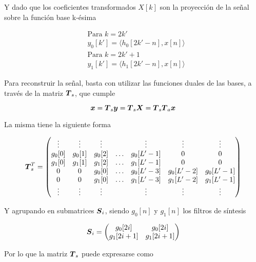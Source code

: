 Y dado que los coeficientes transformados $X[k]$ son la proyección de la señal sobre la función base k-ésima
	
	\begin{align}
		&\text{Para $k=2k'$}	\nonumber \\
		&y_0[k']=\langle h_0[2k'-n], x[n]\rangle		
	\end{align}
	\begin{align}
		&\text{Para $k=2k'+1$}	\nonumber \\
		&y_1[k']=\langle h_1[2k'-n], x[n]\rangle
	\end{align}

Para reconstruir la señal, basta con utilizar las funciones duales de las bases, a través de la matriz $\boldsymbol{T}_s$, que cumple

	\begin{equation}
		\boldsymbol{x}=\boldsymbol{T}_s\boldsymbol{y}=\boldsymbol{T}_s\boldsymbol{X}=\boldsymbol{T}_s\boldsymbol{T}_a\boldsymbol{x}
	\end{equation}

La misma tiene la siguiente forma

	\begin{equation}
		\vect{T}^T_s
		=
		\begin{pmatrix*}[c]
			\vdots & \vdots & \vdots & & \vdots & \vdots & \vdots\\
			g_0[0] & g_0[1] & g_0[2] & \hdots & g_0[L'-1] & 0 & 0 \\
			g_1[0] & g_1[1] & g_1[2] & \hdots & g_1[L'-1] & 0 & 0 \\
			0 & 0 & g_0[0] & \hdots & g_0[L'-3] & g_0[L'-2] & g_0[L'-1] \\
			0 & 0 & g_1[0] & \hdots & g_1[L'-3] & g_1[L'-2] & g_1[L'-1] \\
			\vdots & \vdots & \vdots & & \vdots & \vdots & \vdots \\
		\end{pmatrix*}	
	\end{equation}

Y agrupando en submatrices $\boldsymbol{S}_i$, siendo $g_0[n]$ y $g_1[n]$ los filtros de síntesis

	\begin{equation}
		\vect{S}_i
		=
		\begin{pmatrix*}[c]
			g_0[2i] & g_0[2i] \\
			g_1[2i+1] & g_1[2i+1] \\
		\end{pmatrix*}
	\end{equation}

Por lo que la matriz $\boldsymbol{T}_s$ puede expresarse como

